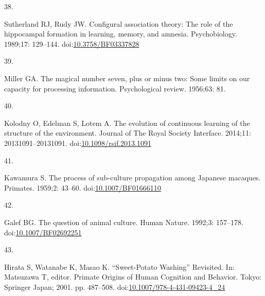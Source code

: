 \documentclass[10pt,letterpaper]{article}
\newlength{\cslhangindent}
\newlength{\csllabelwidth}
\newlength{\cslentryspacingunit} %
\newenvironment{CSLReferences}[2] %
 {%
  \setlength{\parindent}{0pt}
  \ifodd #1
  \let\oldpar\par
  \def\par{\hangindent=\cslhangindent\oldpar}
  \fi
  \setlength{\parskip}{#2\cslentryspacingunit}
 }%
 {}
\newcommand{\CSLLeftMargin}[1]{\parbox[t]{\csllabelwidth}{#1}}
\newcommand{\CSLRightInline}[1]{\parbox[t]{\linewidth - \csllabelwidth}{#1}\break}
\begin{document}
\begin{CSLReferences}{0}{0}
\leavevmode{}%
\CSLLeftMargin{38. }
\CSLRightInline{Sutherland RJ, Rudy JW. Configural association theory:
{The} role of the hippocampal formation in learning, memory, and
amnesia. Psychobiology. 1989;17: 129--144.
doi:\href{https://doi.org/10.3758/BF03337828}{10.3758/BF03337828}}

\leavevmode{}%
\CSLLeftMargin{39. }
\CSLRightInline{Miller GA. The magical number seven, plus or minus two:
{Some} limits on our capacity for processing information. Psychological
review. 1956;63: 81. }

\leavevmode{}%
\CSLLeftMargin{40. }
\CSLRightInline{Kolodny O, Edelman S, Lotem A. The evolution of
continuous learning of the structure of the environment. Journal of The
Royal Society Interface. 2014;11: 20131091--20131091.
doi:\href{https://doi.org/10.1098/rsif.2013.1091}{10.1098/rsif.2013.1091}}

\leavevmode{}%
\CSLLeftMargin{41. }
\CSLRightInline{Kawamura S. The process of sub-culture propagation among
{Japanese} macaques. Primates. 1959;2: 43--60.
doi:\href{https://doi.org/10.1007/BF01666110}{10.1007/BF01666110}}

\leavevmode{}%
\CSLLeftMargin{42. }
\CSLRightInline{Galef BG. The question of animal culture. Human Nature.
1992;3: 157--178.
doi:\href{https://doi.org/10.1007/BF02692251}{10.1007/BF02692251}}

\leavevmode{}%
\CSLLeftMargin{43. }
\CSLRightInline{Hirata S, Watanabe K, Masao K. {``{Sweet}-{Potato}
{Washing}''} {Revisited}. In: Matsuzawa T, editor. Primate {Origins} of
{Human} {Cognition} and {Behavior}. Tokyo: Springer Japan; 2001. pp.
487--508.
doi:\href{https://doi.org/10.1007/978-4-431-09423-4_24}{10.1007/978-4-431-09423-4\_24}}

\end{CSLReferences}

\nolinenumbers
\end{document}
